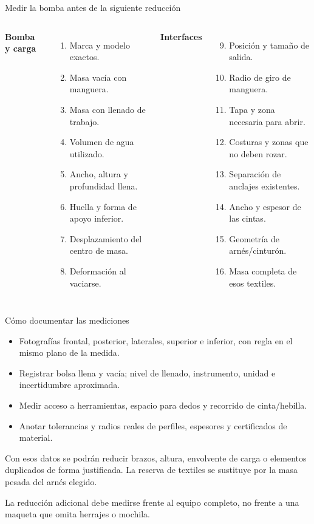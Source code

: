 \documentclass[10pt,aspectratio=169]{beamer}
\newcommand{\mcref}{Guía de diseño}
\begin{document}
\gdef\mcref{Mathcad: sección 26 / pág. 44}
\begin{frame}[t]{Medir la bomba antes de la siguiente reducción}

\begin{columns}[T,onlytextwidth]
\textbf{Bomba y carga}
\begin{enumerate}
\item Marca y modelo exactos.
\item Masa vacía con manguera.
\item Masa con llenado de trabajo.
\item Volumen de agua utilizado.
\item Ancho, altura y profundidad llena.
\item Huella y forma de apoyo inferior.
\item Desplazamiento del centro de masa.
\item Deformación al vaciarse.
\end{enumerate}
\textbf{Interfaces}
\begin{enumerate}\setcounter{enumi}{8}
\item Posición y tamaño de salida.
\item Radio de giro de manguera.
\item Tapa y zona necesaria para abrir.
\item Costuras y zonas que no deben rozar.
\item Separación de anclajes existentes.
\item Ancho y espesor de las cintas.
\item Geometría de arnés/cinturón.
\item Masa completa de esos textiles.
\end{enumerate}
\end{columns}

\end{frame}

\gdef\mcref{Mathcad: sección 26 / pág. 44}
\begin{frame}[t]{Cómo documentar las mediciones}

\begin{itemize}
\item Fotografías frontal, posterior, laterales, superior e inferior, con regla en el mismo plano de la medida.
\item Registrar bolsa llena y vacía; nivel de llenado, instrumento, unidad e incertidumbre aproximada.
\item Medir acceso a herramientas, espacio para dedos y recorrido de cinta/hebilla.
\item Anotar tolerancias y radios reales de perfiles, espesores y certificados de material.
\end{itemize}
Con esos datos se podrán reducir brazos, altura, envolvente de carga o elementos duplicados de forma justificada. La reserva de textiles se sustituye por la masa pesada del arnés elegido.

La reducción adicional debe medirse frente al equipo completo, no frente a una maqueta que omita herrajes o mochila.

\end{frame}
\end{document}

